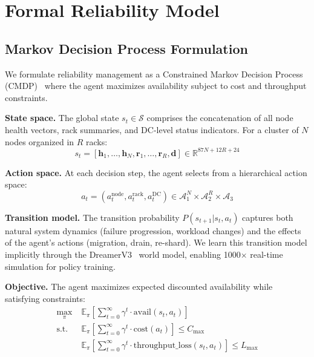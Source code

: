 \documentclass[conference,10pt,letterpaper]{IEEEtran}
\begin{document}


\section{Formal Reliability Model}
\label{sec:formal}

\subsection{Markov Decision Process Formulation}

We formulate reliability management as a Constrained Markov Decision Process (CMDP)~\cite{achiam2017cpo} where the agent maximizes availability subject to cost and throughput constraints.

\textbf{State space.} The global state $s_t \in \mathcal{S}$ comprises the concatenation of all node health vectors, rack summaries, and DC-level status indicators. For a cluster of $N$ nodes organized in $R$ racks:
\begin{equation}
s_t = [\mathbf{h}_1, \ldots, \mathbf{h}_N, \mathbf{r}_1, \ldots, \mathbf{r}_R, \mathbf{d}] \in \mathbb{R}^{87N + 12R + 24}
\end{equation}

\textbf{Action space.} At each decision step, the agent selects from a hierarchical action space:
\begin{equation}
a_t = (a_t^{\text{node}}, a_t^{\text{rack}}, a_t^{\text{DC}}) \in \mathcal{A}_1^N \times \mathcal{A}_2^R \times \mathcal{A}_3
\end{equation}

\textbf{Transition model.} The transition probability $P(s_{t+1} | s_t, a_t)$ captures both natural system dynamics (failure progression, workload changes) and the effects of the agent's actions (migration, drain, re-shard). We learn this transition model implicitly through the DreamerV3~\cite{hafner2023dreamerv3} world model, enabling 1000$\times$ real-time simulation for policy training.

\textbf{Objective.} The agent maximizes expected discounted availability while satisfying constraints:
\begin{equation}
\begin{split}
\max_\pi \; & \mathbb{E}_\pi \left[\sum_{t=0}^{\infty} \gamma^t \cdot \text{avail}(s_t, a_t)\right] \\
\text{s.t.} \; & \mathbb{E}_\pi \left[\sum_{t=0}^{\infty} \gamma^t \cdot \text{cost}(a_t)\right] \leq C_{\max} \\
& \mathbb{E}_\pi \left[\sum_{t=0}^{\infty} \gamma^t \cdot \text{throughput\_loss}(s_t, a_t)\right] \leq L_{\max}
\end{split}
\end{equation}
\end{document}
